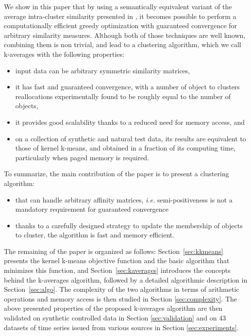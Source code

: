 \documentclass[10pt,letterpaper]{article}
\begin{document}
We show in this paper that by using a semantically equivalent variant of the average intra-cluster similarity presented in \cite[Chapter 10.7]{Duda01}, it becomes possible to perform a computationally efficient greedy optimization \cite[Chapter 10.8]{Duda01} with guaranteed convergence for arbitrary similarity measures. Although both of those techniques are well known, combining them is non trivial, and lead to a clustering algorithm, which we call k-averages with the following properties:
\begin{itemize}
\item input data can be arbitrary symmetric similarity matrices,
\item it has fast and guaranteed convergence, with a number of object to clusters reallocations experimentally found to be roughly equal to the number of objects,
\item it provides good scalability thanks to a reduced need for memory access, and
\item on a collection of synthetic and natural test data, its results are equivalent to those of kernel k-means, and obtained in a fraction of its computing time, particularly when paged memory is required.
\end{itemize}

To summarize, the main contribution of the paper is to present a clustering algorithm:
\begin{itemize}
  \item  that can handle arbitrary affinity matrices, \textit{i.e.} semi-positiveness is not a mandatory requirement for guaranteed convergence
  \item thanks to a carefully designed strategy to update the membership of objects to cluster, the algorithm is fast and memory efficient.
\end{itemize}

The remaining of the paper is organized as follows: Section~\ref{sec:kkmeans} presents the kernel k-means objective function and the basic algorithm that minimizes this function, and Section~\ref{sec:kaverages} introduces the concepts behind the k-averages algorithm,
followed by a detailed algorithmic description in Section~\ref{sec:algo}.
The complexity of the two algorithms in terms of arithmetic operations and memory access is then studied in Section \ref{sec:complexity}. The above presented properties of the proposed k-averages algorithm are then validated on synthetic controlled data in Section \ref{sec:validation} and on 43 datasets of time series issued from various sources in Section \ref{sec:experiments}.
\end{document}
